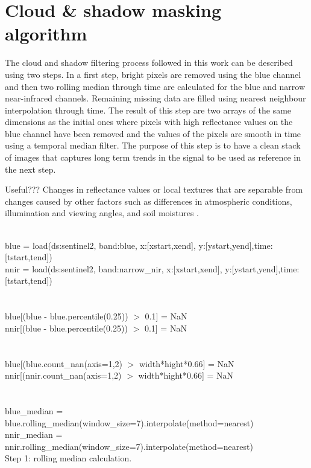 \documentclass[essd, manuscript]{copernicus}
\begin{document}

\appendix
\section{Cloud \& shadow masking algorithm} %

The cloud and shadow filtering process followed in this work can be described using two steps. In a first step, bright pixels are removed using the blue channel and then two rolling median through time are calculated for the blue and narrow near-infrared channels. Remaining missing data are filled using nearest neighbour interpolation through time. The result of this step are two arrays of the same dimensions as the initial ones where pixels with high reflectance values on the blue channel have been removed and the values of the pixels are smooth in time using a temporal median filter. The purpose of this step is to have a clean stack of images that captures long term trends in the signal to be used as reference in the next step.

Useful??? Changes in reflectance values or local textures that are separable from changes caused by other factors such as differences in atmospheric conditions, illumination and viewing angles, and soil moistures \citep{deng2008pca}.

\begin{algorithm}[H]
\SetAlgoLined
 \\
 blue = load(ds:sentinel2, band:blue, x:[xstart,xend], y:[ystart,yend],time:[tstart,tend])\\
 nnir = load(ds:sentinel2, band:narrow\_nir, x:[xstart,xend], y:[ystart,yend],time:[tstart,tend])\\
 \\
 \\
 blue[(blue - blue.percentile(0.25)) $>$ 0.1] = NaN\\
 nnir[(blue - blue.percentile(0.25)) $>$ 0.1] = NaN\\
 \\
 \\
 blue[(blue.count\_nan(axis=1,2) $>$ width*hight*0.66] = NaN\\
 nnir[(nnir.count\_nan(axis=1,2) $>$ width*hight*0.66] = NaN\\
 \\
 \\
 blue\_median = blue.rolling\_median(window\_size=7).interpolate(method=nearest)\\
 nnir\_median = nnir.rolling\_median(window\_size=7).interpolate(method=nearest)\\
 \caption{Step 1: rolling median calculation.}
\end{algorithm}
\end{document}
